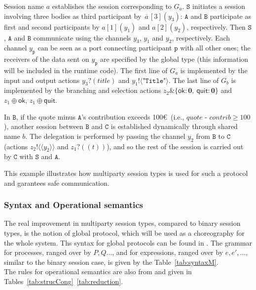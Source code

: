 \documentclass{article}
\newcommand{\Ia}{\ensuremath{a}}
\newcommand{\Ib}{\ensuremath{b}}
\newcommand{\y}{\ensuremath{y}}
\newcommand{\PP}{\ensuremath{P}}
\newcommand{\Q}{\ensuremath{Q}}
\newcommand{\e}{\ensuremath{e}}
\newcommand{\participant}[1]{\ensuremath{\mathtt{#1}}}
\newcommand{\p}{\ensuremath{\participant{p}}}
\newcommand{\z}{\ensuremath{z}}
\newcommand{\inact}{\ensuremath{\mathbf{0}}}
\newcommand{\G}{\ensuremath{G}}
\renewcommand{\bar}[1]{\overline{\,#1\,}}
\begin{document}
Session name $\Ia$ establishes the session corresponding to
$\G_\Ia$.
\participant{S} initiates a session involving three bodies as third participant by
$\bar{a}[3](y_3)$: \participant{A} and \participant{B} participate
as first and second participants by $a[1](y_1)$ and
$a[2](y_2)$, respectively. Then \participant{S}, \participant{A} and
\participant{B} communicate using the channels $y_3$, $y_1$ and
$y_2$, respectively. Each channel $\y_\p$ can be seen as a
port connecting participant $\p$ with all other ones; the
receivers of the data sent on $\y_\p$ are specified by the global
type (this information will be included in the runtime code). The
first line of $\G_\Ia$ is implemented by the input and output
actions $y_3?(\textit{title})$ and $y_1!\langle \texttt{"Title"}
\rangle$. The last line of $\G_\Ib$ is implemented by the branching
and selection actions $z_2\& \{\mathsf{ok}: \inact, \ \mathsf{quit}:
\inact\}$ and $z_1\oplus \mathsf{ok}$, $z_1\oplus \mathsf{quit}$.

In \participant{B}, if the quote minus \participant{A}'s
contribution exceeds 100\euro\ (i.e., $\textit{quote - contrib} \geq
100$), another session  between \participant{B} and
\participant{C} is established dynamically through shared name
$\Ib$. The delegation is performed by passing the channel $y_2$ from
\participant{B} to \participant{C} (actions $\z_2!\langle\!
\langle y_2 \rangle\!\rangle$ and $\z_1?(\! (t)\!)$), and so the
rest of the session is carried out by \participant{C} with
\participant{S} and \participant{A}. 

This example illustrates how multiparty session types is used for such a protocol and garantees safe communication.\\

\subsubsection{Syntax and Operational semantics}

The real improvement in multiparty session types, compared to binary session types, is the notion of global protocol, which will be used as a choreography for the whole system. Ths syntax for global protocols can be found in \cite{coppoglobal}.
The grammar for processes, ranged over by $\PP,\Q\dots$, and for expressions, ranged over by $\e,\e',\dots$, similar to the binary session case, is given by the Table~\ref{tab:syntaxM}.\\
The rules for operational semantics are also from \cite{coppoglobal} and given in Tables~\ref{tab:strucCong}~\ref{tab:reduction}.
\end{document}

